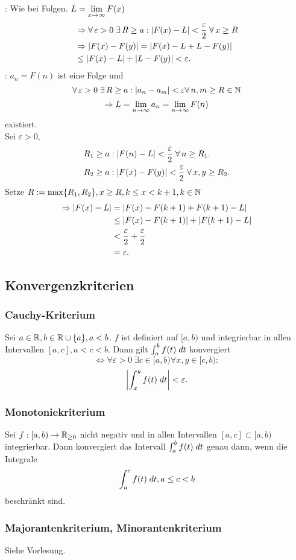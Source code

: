 \documentclass[../ana2u.tex]{subfiles}
\begin{document}
\begin{bew}
    \gqq{\( \Rightarrow \)}: Wie bei Folgen. 
    \( L = \limes{x} F(x) \)
    \begin{align*}
        &\Rightarrow \forall \varepsilon > 0 \;\exists R 
        \geq a : \abs{F(x) - L} < \frac{\varepsilon}{2} 
        \; \forall x \geq R \\
        &\Rightarrow \abs{F(x) - F(y)} 
        = \abs{F(x) - L + L - F(y)} \\
        &\leq \abs{F(x) - L} + \abs{L - F(y)} < \varepsilon.
    \end{align*}
    \gqq{\( \Leftarrow \)}:   
    \( a_n = F(n) \) ist eine Folge und 
    \[ \forall \varepsilon > 0 \;\exists R \geq a: 
    \abs{a_n - a_m} < \varepsilon \forall n,m \geq R \in\N \]
    \[ \Rightarrow L = \limes{n} a_n = \limes{n} F(n) \]
    existiert.\\
    Sei \( \varepsilon > 0, \)
    \begin{align*}
        &R_1 \geq a: \abs{F(n) - L} 
        < \frac{\varepsilon}{2} \;\forall n\geq R_1. \\
        &R_2 \geq a : \abs{F(x) - F(y)} < \frac{\varepsilon}{2}
        \;\forall x,y \geq R_2.
   \end{align*}
    Setze \( R := \max\set{R_1, R_2}, x \geq R, 
    k \leq x < k+1, k\in\N \)
    \begin{align*}
        \Rightarrow \abs{F(x) - L} &= \abs{F(x) - F(k+1) 
        + F(k+1) - L} \\
        &\leq \abs{F(x) - F(k+1)} + \abs{F(k+1) - L} \\
        &< \frac{\varepsilon}{2} + \frac{\varepsilon}{2} \\
        &= \varepsilon.
    \end{align*}
\end{bew}
\subsection{Konvergenzkriterien}
\subsubsection{Cauchy-Kriterium}
Sei \(a\in\R, b \in \R \cup \set{a}, a < b\).
\(f\) ist definiert auf \([a,b)\) und integrierbar
in allen Intervallen \( [a,c], a < c < b \).
Dann gilt \( \integralx{f(t)}{a}{b}{t} \) 
konvergiert
\[ \Leftrightarrow \forall \varepsilon > 0 \;\exists 
c \in [a,b) \forall x,y \in [c,b):  \]
\[ \abs{ \integralx{f(t)}{x}{y}{t} } < \varepsilon. \]
\subsubsection{Monotoniekriterium}
Sei \( \abb{f}{[a,b)}{\R_{\geq 0}} \) nicht negativ und in
allen Intervallen \( [a,c] \subset [a,b) \) integrierbar.
Dann konvergiert das Intervall \( \integralx{f(t)}{a}{b}{t} \)
genau dann, wenn die Integrale
\[ \integralx{f(t)}{a}{c}{t}, a \leq c < b \]
beschränkt sind.
\subsubsection{Majorantenkriterium, Minorantenkriterium}
Siehe Vorlesung.
\end{document}
